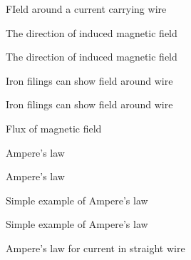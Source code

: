 \documentclass[compress]{beamer}
\begin{document}
{
    \begin{frame}{FIeld around a current carrying wire}
    \end{frame}
}

{
    \begin{frame}{The direction of induced magnetic field}
    \end{frame}
}

{
    \begin{frame}{The direction of induced magnetic field}
    \end{frame}
}

{
    \begin{frame}{Iron filings can show field around wire}
    \end{frame}
}

{
    \begin{frame}{Iron filings can show field around wire}
    \end{frame}
}

{
    \begin{frame}{Flux of magnetic field}
    \end{frame}
}

{
    \begin{frame}{Ampere's law}
    \end{frame}
}

{
    \begin{frame}{Ampere's law}
    \end{frame}
}

{
    \begin{frame}{Simple example of Ampere's law}
    \end{frame}
}

{
    \begin{frame}{Simple example of Ampere's law}
    \end{frame}
}

{
    \begin{frame}{Ampere's law for current in straight wire}
    \end{frame}
}
\end{document}
